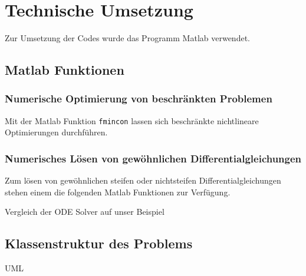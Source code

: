\chapter{Technische Umsetzung}

Zur Umsetzung der Codes wurde das Programm Matlab verwendet.

\section{Matlab Funktionen}

\subsection{Numerische Optimierung von beschränkten Problemen}
Mit der Matlab Funktion \verb|fmincon| lassen sich beschränkte nichtlineare Optimierungen durchführen.


\subsection{Numerisches Lösen von gewöhnlichen Differentialgleichungen}
Zum lösen von gewöhnlichen steifen oder nichtsteifen Differentialgleichungen stehen einem die folgenden Matlab Funktionen zur Verfügung.

Vergleich der ODE Solver auf unser Beispiel







\section{Klassenstruktur des Problems}

UML

